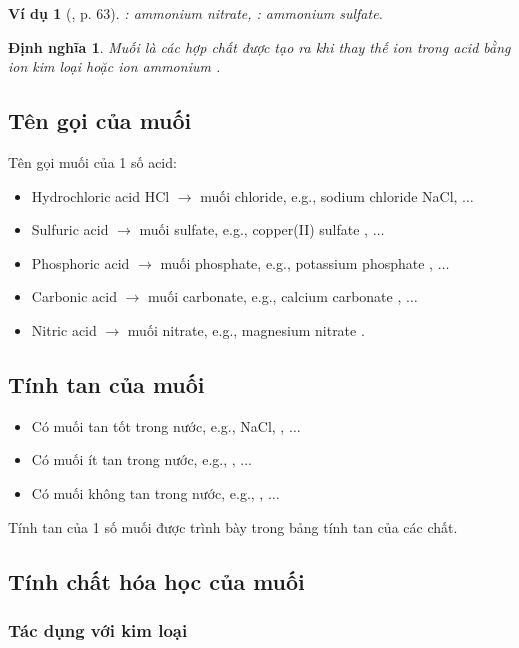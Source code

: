 \documentclass{article}
\newtheorem{dinhnghia}{Định nghĩa}
\newtheorem{vidu}{Ví dụ}
\begin{document}
\begin{vidu}[\cite{SGK_KHTN_8_Canh_Dieu}, p. 63]
	{\rm{}}: ammonium nitrate, {\rm{}}: ammonium sulfate.
\end{vidu}

\begin{dinhnghia}
	{\rm Muối} là các hợp chất được tạo ra khi thay thế ion {\rm{}} trong acid bằng ion kim loại hoặc ion ammonium {\rm{}}.
\end{dinhnghia}

\subsection{Tên gọi của muối}
Tên gọi muối của 1 số acid:
\begin{itemize}
	\item Hydrochloric acid HCl $\to$ muối chloride, e.g., sodium chloride NaCl, $\ldots$
	\item Sulfuric acid  $\to$ muối sulfate, e.g., copper(II) sulfate , $\ldots$
	\item Phosphoric acid  $\to$ muối phosphate, e.g., potassium phosphate , $\ldots$
	\item Carbonic acid  $\to$ muối carbonate, e.g., calcium carbonate , $\ldots$
	\item Nitric acid  $\to$ muối nitrate, e.g., magnesium nitrate .
\end{itemize}

\subsection{Tính tan của muối}
\begin{itemize}
	\item Có muối tan tốt trong nước, e.g., NaCl, , $\ldots$
	\item Có muối ít tan trong nước, e.g., , $\ldots$
	\item Có muối không tan trong nước, e.g., , $\ldots$
\end{itemize}
Tính tan của 1 số muối được trình bày trong bảng tính tan của các chất.

\subsection{Tính chất hóa học của muối}

\subsubsection{Tác dụng với kim loại}
\end{document}
